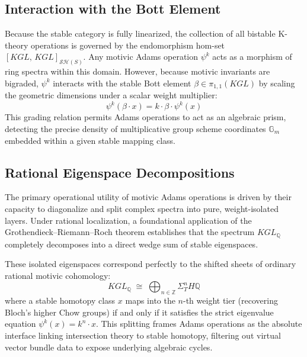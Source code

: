 \documentclass[11pt,oneside]{article}
\begin{document}
\subsection{Interaction with the Bott Element}
Because the stable category is fully linearized, the collection of all bistable K-theory operations is governed by the endomorphism hom-set $[KGL, \, KGL]_{\mathcal{S}\mathcal{H}(S)}$. Any motivic Adams operation $\psi^k$ acts as a morphism of ring spectra within this domain. However, because motivic invariants are bigraded, $\psi^k$ interacts with the stable Bott element $\beta \in \pi_{1,1}(KGL)$ by scaling the geometric dimensions under a scalar weight multiplier:
\[ \psi^k(\beta \cdot x) = k \cdot \beta \cdot \psi^k(x) \]
This grading relation permits Adams operations to act as an algebraic prism, detecting the precise density of multiplicative group scheme coordinates $\mathbb{G}_m$ embedded within a given stable mapping class.

\subsection{Rational Eigenspace Decompositions}
The primary operational utility of motivic Adams operations is driven by their capacity to diagonalize and split complex spectra into pure, weight-isolated layers. Under rational localization, a foundational application of the Grothendieck--Riemann--Roch theorem establishes that the spectrum $KGL_\mathbb{Q}$ completely decomposes into a direct wedge sum of stable eigenspaces. 

These isolated eigenspaces correspond perfectly to the shifted sheets of ordinary rational motivic cohomology:
\[ KGL_\mathbb{Q} \;\cong\; \bigoplus_{n \in \mathbb{Z}} \Sigma_{T}^n H\mathbb{Q} \]
where a stable homotopy class $x$ maps into the $n$-th weight tier (recovering Bloch's higher Chow groups) if and only if it satisfies the strict eigenvalue equation $\psi^k(x) = k^n \cdot x$. This splitting frames Adams operations as the absolute interface linking intersection theory to stable homotopy, filtering out virtual vector bundle data to expose underlying algebraic cycles.
\end{document}
